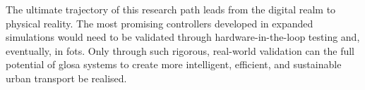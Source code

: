 The ultimate trajectory of this research path leads from the digital realm to physical reality. The most promising controllers developed in expanded simulations would need to be validated through hardware-in-the-loop testing and, eventually, in \acp{fot}. Only through such rigorous, real-world validation can the full potential of \ac{glosa} systems to create more intelligent, efficient, and sustainable urban transport be realised.
